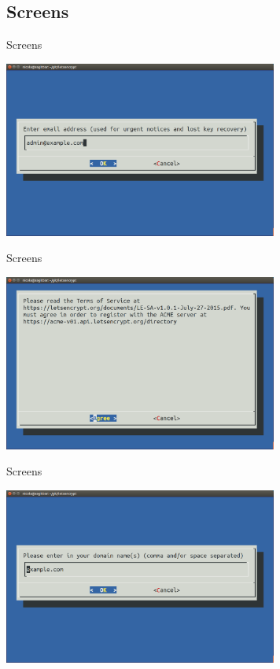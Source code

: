 \documentclass[xcolor=svgnames,11pt]{beamer}
\begin{document}
\subsection{Screens}
\begin{frame}{Screens}
\begin{center}
\includegraphics[width=9cm]{img/screen1.png}
\end{center}
\end{frame}
\begin{frame}{Screens}
\begin{center}
\includegraphics[width=9cm]{img/screen2.png}
\end{center}
\end{frame}
\begin{frame}{Screens}
\begin{center}
\includegraphics[width=9cm]{img/screen3.png}
\end{center}
\end{frame}
\end{document}
